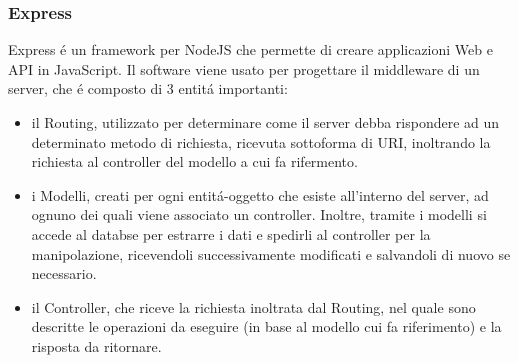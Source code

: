 \subsubsection{Express}
Express \'e un framework per NodeJS che permette di creare applicazioni Web e API in JavaScript.
Il software viene usato per progettare il middleware di un server, che \'e composto di 3 entit\'a importanti:
\begin{itemize}
\item il Routing, utilizzato per determinare come il server debba rispondere ad un determinato metodo di richiesta,
ricevuta sottoforma di URI, inoltrando la richiesta al controller del modello a cui fa rifermento.
\item i Modelli, creati per ogni entit\'a-oggetto che esiste all'interno del server, ad ognuno dei quali viene associato
un controller. Inoltre, tramite i modelli si accede al databse per estrarre i dati e spedirli al controller per
la manipolazione, ricevendoli successivamente modificati e salvandoli di nuovo se necessario.
\item il Controller, che riceve la richiesta inoltrata dal Routing, nel quale sono descritte le operazioni da eseguire
(in base al modello cui fa riferimento) e la risposta da ritornare.
\\[2\baselineskip]
\end{itemize}

